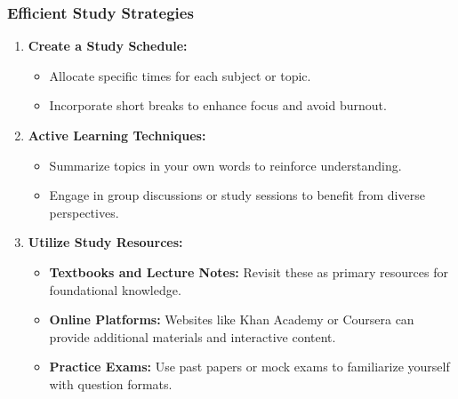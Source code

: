 \documentclass[aspectratio=169]{beamer}
\begin{document}
\begin{frame}[fragile]
    \frametitle{Efficient Study Strategies}
    \begin{enumerate}
        \item \textbf{Create a Study Schedule:}
        \begin{itemize}
            \item Allocate specific times for each subject or topic.
            \item Incorporate short breaks to enhance focus and avoid burnout.
        \end{itemize}
        
        \item \textbf{Active Learning Techniques:}
        \begin{itemize}
            \item Summarize topics in your own words to reinforce understanding.
            \item Engage in group discussions or study sessions to benefit from diverse perspectives.
        \end{itemize}
        
        \item \textbf{Utilize Study Resources:}
        \begin{itemize}
            \item \textbf{Textbooks and Lecture Notes:} Revisit these as primary resources for foundational knowledge.
            \item \textbf{Online Platforms:} Websites like Khan Academy or Coursera can provide additional materials and interactive content.
            \item \textbf{Practice Exams:} Use past papers or mock exams to familiarize yourself with question formats.
        \end{itemize}
    \end{enumerate}
\end{frame}
\end{document}
